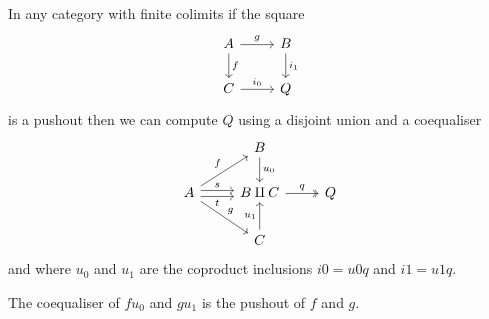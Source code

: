 \documentclass{article}
\begin{document}
In any category with finite colimits if the square
\begin{equation*}
  \begin{tikzcd}
   A \rar{g} \dar{f} & B\dar{i_1}\\
   C \rar{i_0} & Q
  \end{tikzcd}
\end{equation*}
is a pushout then we can compute $Q$ using a disjoint union and a coequaliser
\begin{equation*}
  \begin{tikzcd}
   {} & B \dar{u_0} & {}\\
   A \urar{f} \drar{g} \rar[yshift=0.5ex]{s} \rar[yshift=-0.5ex][swap]{t} & B\amalg C \rar[twoheadrightarrow]{q} & Q\\
   {} & C \uar{u_1} & {}
  \end{tikzcd}
\end{equation*}
and where $u_0$ and $u_1$ are the coproduct inclusions $i0=u0 q$ and $i1= u1 q$.

\begin{proposition}
  The coequaliser of $fu_0$ and $gu_1$ is the pushout of $f$ and $g$.
\end{proposition}



\end{document}
